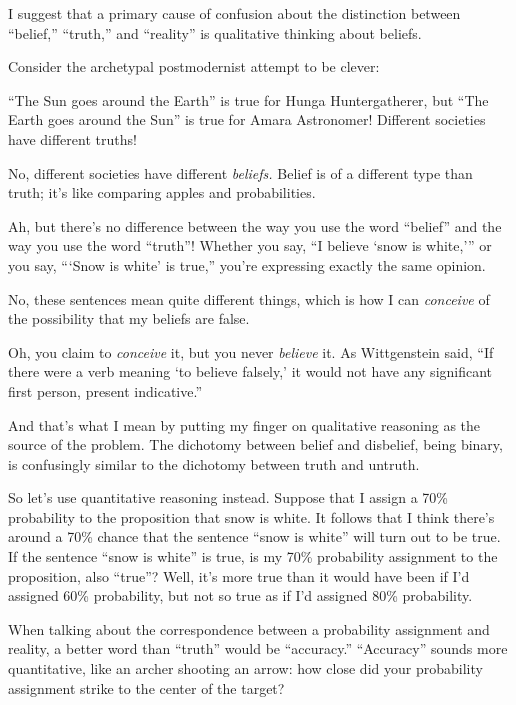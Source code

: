 
{
 I suggest that a primary cause of confusion about the distinction
between ``belief,''
``truth,'' and
``reality'' is qualitative thinking
about beliefs. }

{
 Consider the archetypal postmodernist attempt to be clever:}

{
 ``The Sun goes around the
Earth'' is true for Hunga Huntergatherer, but
``The Earth goes around the Sun'' is
true for Amara Astronomer! Different societies have different truths!}

{
 No, different societies have different \textit{beliefs.} Belief is
of a different type than truth; it's like comparing
apples and probabilities.}

{
 Ah, but there's no difference between the way you
use the word ``belief'' and the way
you use the word ``truth''! Whether
you say, ``I believe `snow is
white,''' or you say,
```Snow is white' is
true,'' you're expressing exactly the
same opinion.}

{
 No, these sentences mean quite different things, which is how I
can \textit{conceive} of the possibility that my beliefs are false.}

{
 Oh, you claim to \textit{conceive} it, but you never
\textit{believe} it. As Wittgenstein said, ``If there
were a verb meaning `to believe
falsely,' it would not have any significant first
person, present indicative.''}

{
 And that's what I mean by putting my finger on
qualitative reasoning as the source of the problem. The dichotomy
between belief and disbelief, being binary, is confusingly similar to
the dichotomy between truth and untruth.}

{
 So let's use quantitative reasoning instead.
Suppose that I assign a 70\% probability to the proposition that snow
is white. It follows that I think there's around a 70\%
chance that the sentence ``snow is
white'' will turn out to be true. If the sentence
``snow is white'' is true, is my
70\% probability assignment to the proposition, also
``true''? Well, it's
more true than it would have been if I'd assigned 60\%
probability, but not so true as if I'd assigned 80\%
probability.}

{
 When talking about the correspondence between a probability
assignment and reality, a better word than
``truth'' would be
``accuracy.''
``Accuracy'' sounds more
quantitative, like an archer shooting an arrow: how close did your
probability assignment strike to the center of the target?}

